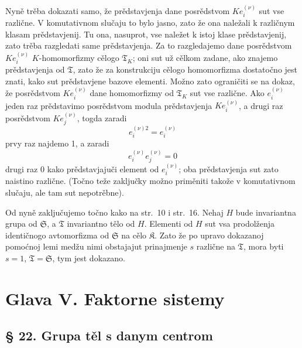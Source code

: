 \documentclass[11pt]{article}
\begin{document}
Nyně trěba dokazati samo, že prědstavjenja dane posrědstvom \(K e_i^{(\nu)}\) sut vse različne. V komutativnom slučaju to bylo jasno, zato že ona naležali k različnym klasam prědstavjenij. Tu ona, nasuprot, vse naležet k istoj klase prědstavjenij, zato trěba razgledati same prědstavjenja. Za to razgledajemo dane posrědstvom \(K e_i^{(\nu)}\) \(K\)-homomorfizmy cělogo \(\mathfrak T_K\); oni sut už cělkom zadane, ako znajemo prědstavjenja od \(\mathfrak T\), zato že za konstrukciju cělogo homomorfizma dostatočno jest znati, kako sut prědstavjene bazove elementi. Možno zato ograničiti se na dokaz, že posrědstvom \(K e_i^{(\nu)}\) dane homomorfizmy od \(\mathfrak T_K\) sut vse različne. Ako \(e_i^{(\nu)}\) jeden raz prědstavimo posrědstvom modula prědstavjenja \(K e_i^{(\nu)}\), a drugi raz posrědstvom \(K e_j^{(\nu)}\), togda zaradi
\[
e_i^{(\nu)2}=e_i^{(\nu)}
\]
prvy raz najdemo 1, a zaradi
\[
e_i^{(\nu)}e_j^{(\nu)}=0
\]
drugi raz 0 kako prědstavjajuči element od \(e_i^{(\nu)}\); oba prědstavjenja sut zato naistino različne. (Točno teže zaključky možno priměniti takože v komutativnom slučaju, ale tam sut nepotrěbne).

Od nyně zaključujemo točno kako na str.~10 i str.~16. Nehaj \(H\) bude invariantna grupa od \(\mathfrak S\), a \(\mathfrak T\) invariantno tělo od \(H\). Elementi od \(H\) sut vsa prodolženja identičnogo avtomorfizma od \(\mathfrak S\) na cělo \(\mathfrak K\). Zato že po upravo dokazanoj pomoćnoj lemi medžu nimi obstajajut prinajmenje \(s\) različne na \(\mathfrak T\), mora byti \(s=1\), \(\mathfrak T=\mathfrak S\), tym jest dokazano.

\section*{Glava V. Faktorne sistemy}\label{kapitel-v.-faktorensysteme}

\subsection*{§ 22. Grupa těl s danym centrom}\label{die-gruppe-der-koerper-mit-gegebenem-zentrum}
\end{document}
